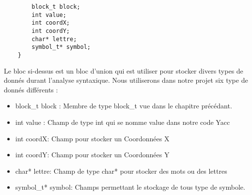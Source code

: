 \lstset{style=mystyle}
\begin{lstlisting}[caption=Union Yacc]
%union {
        block_t block;
        int value;
        int coordX;
        int coordY;
        char* lettre;
        symbol_t* symbol;
    }

\end{lstlisting}

Le bloc si-dessus est un bloc d'union qui est utiliser pour stocker divers types de donnés durant l'analyse syntaxique. Nous utiliserons dans notre projet six type de donnés différents : 

\begin{itemize}
    \item block\_t block : Membre de type block\_t vue dans le chapitre précédant.
    \item int value : Champ de type int qui se nomme value dans notre code Yacc
    \item int coordX: Champ pour stocker un Coordonnées X
    \item int coordY: Champ pour stocker un Coordonnées Y
    \item char* lettre: Champ de type char* pour stocker des mots ou des lettres
    \item symbol\_t* symbol: Champs permettant le stockage de tous type de symbole.
\end{itemize}

\newpage